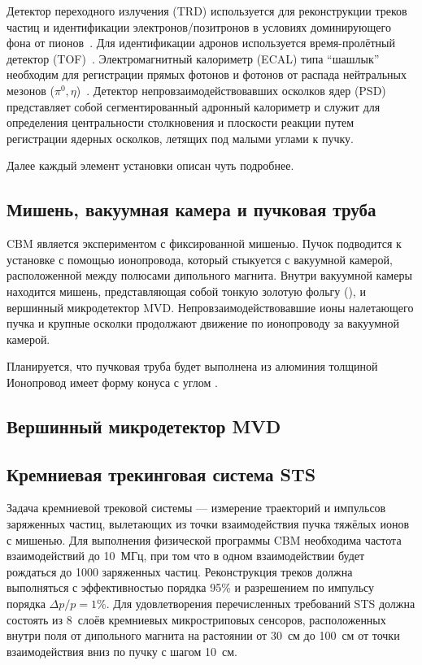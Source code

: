 Детектор переходного излучения (TRD) используется для реконструкции треков частиц и идентификации электронов/позитронов в условиях доминирующего фона от пионов~\cite{TRD}. Для идентификации адронов используется время-пролётный детектор (TOF)~\cite{TDR_TOF}. Электромагнитный калориметр (ECAL) типа ``шашлык'' необходим для регистрации прямых фотонов и фотонов от распада нейтральных мезонов ($ \pi^{0}, \eta $)~\cite{ECAL_KOROLKO}. Детектор непровзаимодействовавших осколков ядер (PSD)~\cite{TDR_PSD} представляет собой сегментированный адронный калориметр и служит для определения центральности столкновения и плоскости реакции путем регистрации ядерных осколков, летящих под малыми углами к пучку.

Далее каждый элемент установки описан чуть подробнее.

\subsection{Мишень, вакуумная камера и пучковая труба}\label{sec:secVacChamberPipe}

CBM является экспериментом с фиксированной мишенью. Пучок подводится к установке с помощью ионопровода, который стыкуется с вакуумной камерой, расположенной между полюсами дипольного магнита. Внутри вакуумной камеры находится мишень, представляющая собой тонкую золотую фольгу (\todo), и вершинный микродетектор MVD. Непровзаимодействовавшие ионы налетающего пучка и крупные осколки продолжают движение по ионопроводу за вакуумной камерой.

Планируется, что пучковая труба будет выполнена из алюминия толщиной \todo
Ионопровод имеет форму конуса с углом \todo.

\subsection{Вершинный микродетектор MVD}\label{sec:secMVD}

\subsection{Кремниевая трекинговая система STS}\label{sec:secSTS}

Задача кремниевой трековой системы --- измерение траекторий и импульсов заряженных частиц, вылетающих из точки взаимодействия пучка тяжёлых ионов с мишенью. Для выполнения физической программы CBM необходима частота взаимодействий до 10~МГц, при том что в одном взаимодействии будет рождаться до 1000 заряженных частиц. Реконструкция треков должна выполняться с эффективностью порядка 95\% и разрешением по импульсу порядка $\Delta p / p = 1\%$. Для удовлетворения перечисленных требований STS должна состоять из 8~слоёв кремниевых микростриповых сенсоров, расположенных внутри поля от дипольного магнита на растоянии от 30~см до 100~см от точки взаимодействия вниз по пучку с шагом 10~см.

